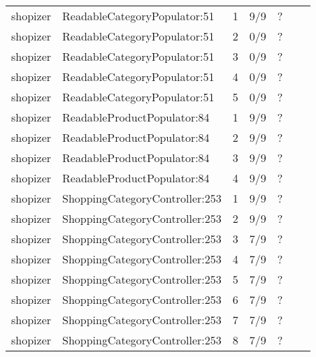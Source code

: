\begin{table}
\begin{tabular}{|r|l|l|l|l|l|r|}
    shopizer & ReadableCategoryPopulator:51 & 1 & 9/9 & ? \\
    shopizer & ReadableCategoryPopulator:51 & 2 & 0/9 & ? \\
    shopizer & ReadableCategoryPopulator:51 & 3 & 0/9 & ? \\
    shopizer & ReadableCategoryPopulator:51 & 4 & 0/9 & ? \\
    shopizer & ReadableCategoryPopulator:51 & 5 & 0/9 & ? \\
    shopizer & ReadableProductPopulator:84 & 1 & 9/9 & ? \\
    shopizer & ReadableProductPopulator:84 & 2 & 9/9 & ? \\
    shopizer & ReadableProductPopulator:84 & 3 & 9/9 & ? \\
    shopizer & ReadableProductPopulator:84 & 4 & 9/9 & ? \\
    shopizer & ShoppingCategoryController:253 & 1 & 9/9 & ? \\
    shopizer & ShoppingCategoryController:253 & 2 & 9/9 & ? \\
    shopizer & ShoppingCategoryController:253 & 3 & 7/9 & ? \\
    shopizer & ShoppingCategoryController:253 & 4 & 7/9 & ? \\
    shopizer & ShoppingCategoryController:253 & 5 & 7/9 & ? \\
    shopizer & ShoppingCategoryController:253 & 6 & 7/9 & ? \\
    shopizer & ShoppingCategoryController:253 & 7 & 7/9 & ? \\
    shopizer & ShoppingCategoryController:253 & 8 & 7/9 & ? \\
    \hline
  \end{tabular}
\end{table}